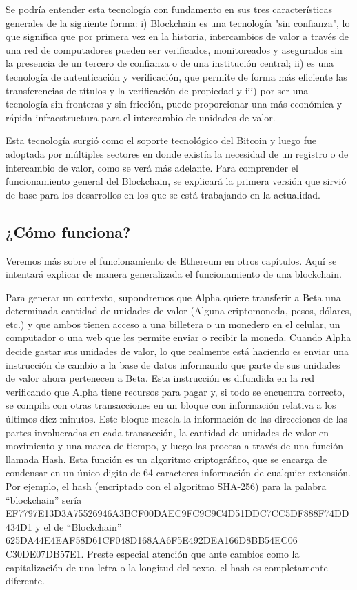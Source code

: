 Se podría entender esta tecnología con fundamento en sus tres características generales de la
siguiente forma: i) Blockchain es una tecnología "sin confianza", lo que significa que por primera
vez en la historia, intercambios de valor a través de una red de computadores pueden ser
verificados, monitoreados y asegurados sin la presencia de un tercero de confianza o
de una institución central; ii) es una tecnología de autenticación y verificación, que permite de
forma más eficiente las transferencias de títulos y la verificación de propiedad y iii) por ser una
tecnología sin fronteras y sin fricción, puede proporcionar una más económica y rápida
infraestructura para el intercambio de unidades de valor.

Esta tecnología surgió como el soporte tecnológico del Bitcoin y luego fue adoptada por múltiples
sectores en donde existía la necesidad de un registro o de intercambio de valor, como se verá más
adelante. Para comprender el funcionamiento general del Blockchain, se explicará la primera versión
que sirvió de base para los desarrollos en los que se está trabajando en la actualidad.


\subsection{¿Cómo funciona?}
Veremos más sobre el funcionamiento de Ethereum en otros capítulos. Aquí se intentará explicar de 
manera generalizada el funcionamiento de una blockchain.

Para generar un contexto, supondremos que Alpha quiere transferir a Beta una determinada
cantidad de unidades de valor (Alguna criptomoneda, pesos, dólares, etc.) y que ambos tienen acceso
a una billetera o un monedero en el celular, un computador o una web que les permite enviar o
recibir la moneda. Cuando Alpha decide gastar sus unidades de valor, lo que realmente está haciendo
es enviar una instrucción de cambio a la base de datos informando que parte de sus unidades de
valor ahora pertenecen a Beta. Esta instrucción es difundida en la red verificando que Alpha tiene
recursos para pagar y, si todo se encuentra correcto, se compila con otras transacciones
en un bloque con información relativa a los últimos diez minutos.
Este bloque mezcla la información de las direcciones de las partes involucradas en cada
transacción, la cantidad de unidades de valor en movimiento y una marca de tiempo, y luego las
procesa a través de una función llamada Hash. Esta función es un algoritmo criptográfico, que se
encarga de condensar en un único digito de 64 caracteres información de cualquier extensión.
Por ejemplo, el hash (encriptado con el algoritmo SHA-256) para la palabra “blockchain” sería
EF7797E13D3A75526946A3BCF00DAEC9FC9C9C4D51DDC7CC5DF888F74DD434D1 y el de “Blockchain”
625DA44E4EAF58D61CF048D168AA6F5E492DEA166D8BB54EC06
C30DE07DB57E1. Preste especial atención que ante cambios como la capitalización de una letra o la
longitud del texto, el hash es completamente diferente.

